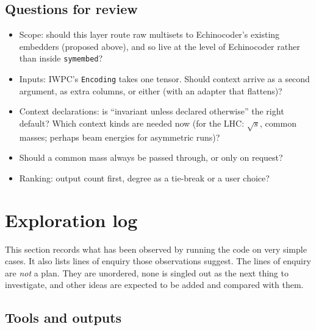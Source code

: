 \documentclass[11pt]{article}
\theoremstyle{definition}
\theoremstyle{remark}
\begin{document}
\subsection{Questions for review}
\begin{itemize}
  \item Scope: should this layer route raw multisets to Echinocoder's existing
    embedders (proposed above), and so live at the level of Echinocoder rather
    than inside \texttt{symembed}?
  \item Inputs: IWPC's \texttt{Encoding} takes one tensor. Should context
    arrive as a second argument, as extra columns, or either (with an adapter
    that flattens)?
  \item Context declarations: is ``invariant unless declared otherwise'' the
    right default? Which context kinds are needed now (for the LHC: $\sqrt{s}$,
    common masses; perhaps beam energies for asymmetric runs)?
  \item Should a common mass always be passed through, or only on request?
  \item Ranking: output count first, degree as a tie-break or a user choice?
\end{itemize}

\section{Exploration log}\label{sec:exploration}

This section records what has been observed by running the code on very simple
cases. It also lists lines of enquiry those observations suggest. The lines of
enquiry are \emph{not} a plan. They are unordered, none is singled out as the
next thing to investigate, and other ideas are expected to be added and
compared with them.

\subsection{Tools and outputs}
\end{document}
